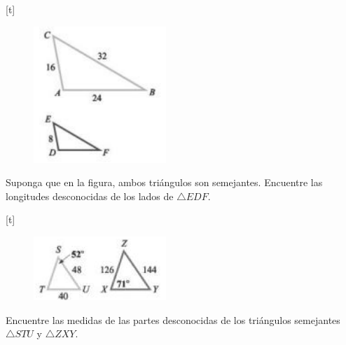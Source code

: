 [t]{}
	\begin{problema}
		\label{exmp:9405}
		\begin{figure}
			\centering
			\includegraphics[width=5cm,keepaspectratio=true]{./trig/trig9446.png}
			\label{fig:9446}
		\end{figure}
		Suponga que en la figura, ambos triángulos son semejantes. Encuentre las longitudes desconocidas de los lados de $\triangle EDF.$
	\end{problema}
	

[t]{}
	\begin{problema}
		\label{exmp:9406}
		\begin{figure}
			\centering
			\includegraphics[width=5cm,keepaspectratio=true]{./trig/trig9447.png}
			\label{fig:9447}
		\end{figure}
		Encuentre las medidas de las partes desconocidas de los triángulos semejantes $\triangle STU$ y $\triangle ZXY.$ 
	\end{problema}
	

